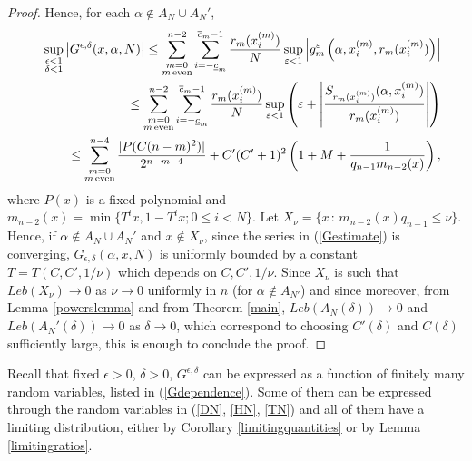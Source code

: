 \documentclass{conm-p-l}
\numberwithin{equation}{section}
\begin{document}
\begin{proof}
Hence, for each $\alpha \notin A_N\cup A_N'$,
\begin{eqnarray}
\nonumber
&&\sup_{\begin{subarray}{c}\epsilon<1\\ \delta <1\end{subarray}} \left| G^{\epsilon, \delta}(x,\alpha, N) \right| \leq  
 \sum_{\begin{subarray}{c}{{m=0}}\\{m \, \mathrm{even}}\end{subarray}}^{n-2} \sum_{i=-\underline{c}_m}^{\overline{c}_m-1} \frac{r_m({x}^{(m)}_i)}{N}
 \sup_{\varepsilon <1}\left| g^{\varepsilon}_m\left( \alpha, {x}^{(m)}_i, r_{m}({x}^{(m)}_i)\right)\right| 
\\\nonumber &&\leq   \sum_{\begin{subarray}{c}{{m=0}}\\{m \, \mathrm{even}}\end{subarray}}^{n-2} \sum_{i=-\underline{c}_m}^{\overline{c}_m-1} \frac{r_m({x}^{(m)}_i)}{N} \sup_{\varepsilon <1}\left(
\varepsilon+ 
\left| \frac{{S_{{r_m({x}^{(m)}_i)}}({\alpha}, {{{x}^{(m)}_i}})}}{r_m({x}^{(m)}_i) } \right| \right) 
\\ && \leq \label{Gestimate}
 \sum_{\begin{subarray}{c}{{m=0}}\\{m \, \mathrm{even}}\end{subarray}}^{n-4} 
\frac{| P(C(n-m)^2)|}
{2^{n-m-4}}  +C'(C'+1)^2\left(1+M+\frac{1}{ q_{n-1} {m_{n-2}(x)}}\right),
\end{eqnarray}
where $P(x)$ is a fixed polynomial 
 and $m_{n-2}(x)= \min \{ T^i x, 1-T^ix; 0\leq i<N \} $. 
Let  $X_\nu = \{ x {\, : \, }   {m_{n-2}(x)}q_{n-1} \leq \nu \}$. Hence, if $\alpha \notin A_N \cup A_N' $ and $x\notin X_{\nu }$, 
 since the series in (\ref{Gestimate}) is converging, $G_{\epsilon, \delta }(\alpha, x, N)$ is uniformly bounded by a constant  $T= T (C, C' , 1/\nu)$ which depends on $C, C' , 1/\nu$.
Since $X_\nu$ is such that $Leb(X_{\nu})\rightarrow 0 $ as $\nu\rightarrow 0$ uniformly in $ n$ (for $\alpha \notin A_{N'}$) and since moreover, from Lemma \ref{powerslemma} and from Theorem \ref{main},    $Leb(A_N(\delta))\rightarrow 0$ and $Leb(A_N'(\delta))\rightarrow 0$ as $\delta \rightarrow 0$, which correspond to choosing  $C'(\delta)$ and  $C(\delta)$ sufficiently large, 
this is enough to conclude the proof.
\end{proof}
Recall that fixed $\epsilon>0$, $ \delta>0$,  $G^{\epsilon,\delta}$ can be expressed as a function of finitely many random variables, listed in (\ref{Gdependence}). Some of them can be expressed through the random variables in (\ref{DN}, \ref{HN}, \ref{TN}) and all of them have a limiting distribution, either by  Corollary \ref{limitingquantities} or by Lemma \ref{limitingratios}.
\end{document}
